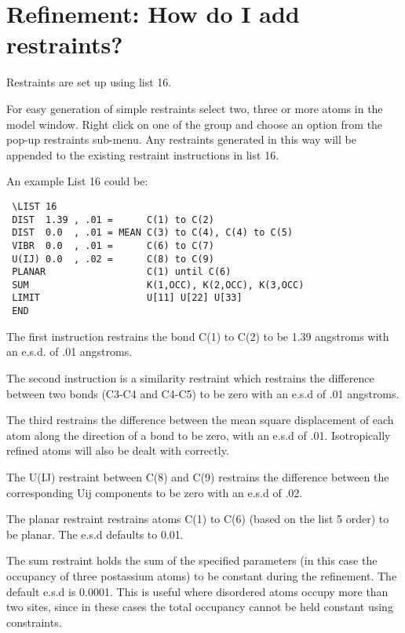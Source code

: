 \documentclass[10pt,a4paper]{report}
\begin{document}
\section{Refinement: How do I add restraints?}


Restraints are set up using list 16.







For easy generation of simple restraints select two, three or
more atoms in the model window. Right click on one of the group
and choose an option from the pop-up restraints sub-menu. Any
restraints generated in this way will be appended to the existing restraint instructions
in list 16.




 An example List 16 could be:
\small\begin{verbatim}
 \LIST 16
 DIST  1.39 , .01 =      C(1) to C(2)
 DIST  0.0  , .01 = MEAN C(3) to C(4), C(4) to C(5)
 VIBR  0.0  , .01 =      C(6) to C(7)
 U(IJ) 0.0  , .02 =      C(8) to C(9)
 PLANAR                  C(1) until C(6)
 SUM                     K(1,OCC), K(2,OCC), K(3,OCC)
 LIMIT                   U[11] U[22] U[33]
 END
\end{verbatim}\normalsize

The first instruction restrains the bond C(1) to C(2) to be 1.39
angstroms with an e.s.d. of .01 angstroms.


 The second instruction is a similarity restraint which restrains the difference
between two bonds (C3-C4 and C4-C5) to be zero with an e.s.d of .01
angstroms.


 The third restrains the difference between the mean square
displacement of each atom along the direction of a bond to be
zero, with an e.s.d of .01. Isotropically refined atoms will also be dealt with
correctly.


 The U(IJ) restraint between C(8) and C(9) restrains the difference between the
 corresponding Uij components to be zero with an e.s.d of .02.


 The planar restraint restrains atoms C(1) to C(6) (based on the
list 5 order) to be planar. The e.s.d defaults to 0.01.


 The sum restraint holds the sum of the specified parameters (in
this case the occupancy of three postassium atoms) to be constant
during the refinement. The default e.s.d is 0.0001. This is
useful where disordered atoms occupy more than two sites, since
in these cases the total occupancy cannot be held constant using
constraints.
\end{document}
